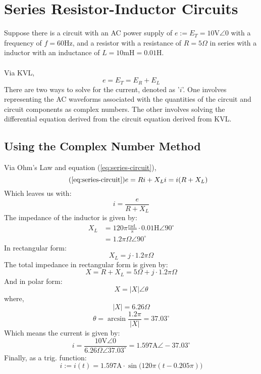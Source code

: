 \documentclass{article}
\begin{document}
	\section[In Series]{Series Resistor-Inductor Circuits}
	Suppose there is a circuit with an AC power supply of 
	$e:=E_T=10\text{V}\angle0$ with a frequency of $f=60 \text{Hz}$, and a 
	resistor with a resistance of $R=5\Omega$ in series with a inductor with an 
	inductance of $L=10\text{mH}=0.01\text{H}$. \\ \\
	Via KVL,
	\begin{equation}\label{eq:series-circuit}
		e=E_T=E_R+E_L
	\end{equation}
	There are two ways to solve for the current, denoted as '$i$'.  One 
	involves representing the AC waveforms associated with the quantities of 
	the circuit and circuit components as complex numbers.  The other involves 
	solving the differential equation derived from the circuit equation derived 
	from KVL.
	\subsection[Complex]{Using the Complex Number Method}
	Via Ohm's Law and equation (\ref{eq:series-circuit}),
	\begin{equation}\tag{\ref{eq:series-circuit}}
		e=Ri + X_Li=i(R+X_L)
	\end{equation}
	Which leaves us with:
	$$ i=\frac{e}{R+X_L}$$
	The impedance of the inductor is given by:
	\begin{align*}
		X_L &= 
		120\pi\frac{\text{rad.}}{\text{s}}\cdot0.01\text{H}\angle90^{\circ} \\
		 &= 1.2\pi \Omega \angle90^{\circ}
	\end{align*}
	In rectangular form:
	$$ X_L = j \cdot 1.2\pi \Omega$$
	The total impedance in rectangular form is given by:
	$$ X = R + X_L = 5\Omega + j \cdot 1.2\pi \Omega$$
	And in polar form:
	$$ X = |X|\angle\theta$$
	where,
	$$ |X| = 6.26\Omega$$
	$$ \theta = \arcsin \frac{1.2\pi}{|X|} = 37.03^{\circ}$$
	Which means the current is given by:
	$$ i = \frac{10\text{V}\angle0}{6.26\Omega\angle37.03^{\circ}} = 
	1.597\text{A}\angle-37.03^{\circ}$$
	Finally, as a trig. function:
	$$i:=i(t)=1.597\text{A}\cdot \sin \big(120\pi(t-0.205\pi)\big)$$
\end{document}
